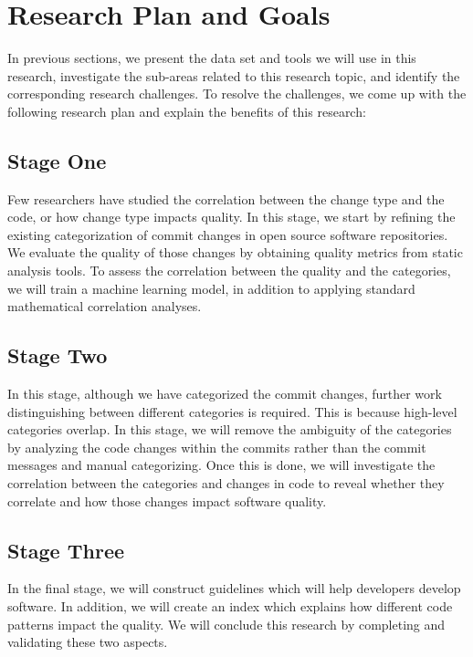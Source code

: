\section{Research Plan and Goals}
\label{sec:goal}

In previous sections, we present the data set and tools we will use in this research, investigate the sub-areas related to this research topic, and identify the corresponding research challenges.
To resolve the challenges, we come up with the following research plan and explain the benefits of this research:

\subsection{Stage One}
Few researchers have studied the correlation between the change type and the code, or how change type impacts quality. 
In this stage, we start by refining the existing categorization of commit changes in open source software repositories.
We evaluate the quality of those changes by obtaining quality metrics from static analysis tools.
To assess the correlation between the quality and the categories, we will train a machine learning model, in addition to applying standard mathematical correlation analyses.

\subsection{Stage Two}
In this stage, although we have categorized the commit changes, further work distinguishing between different categories is required.
This is because high-level categories overlap.
In this stage, we will remove the ambiguity of the categories by analyzing the code changes within the commits rather than the commit messages and manual categorizing.
Once this is done, we will investigate the correlation between the categories and changes in code to reveal whether they correlate and how those changes impact software quality.

\subsection{Stage Three}
In the final stage, we will construct guidelines which will help developers develop software.
In addition, we will create an index which explains how different code patterns impact the quality.
We will conclude this research by completing and validating these two aspects. 

